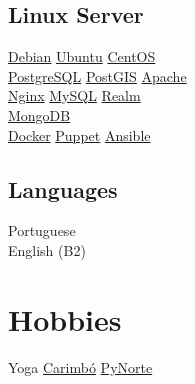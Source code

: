 \documentclass[]{joaosoares-resume}
\begin{document}
\begin{minipage}[t]{0.35\textwidth}
\subsection{Linux Server}
\href{http://www.debian.org/}{Debian}\textbullet{}
\href{http://www.ubuntu.com/}{Ubuntu}\textbullet{}
\href{http://www.centos.org/}{CentOS} \\
\href{http://www.postgresql.org/}{PostgreSQL}\textbullet{}
\href{http://www.postgis.net}{PostGIS}\textbullet{}
\href{http://httpd.apache.org/}{Apache}\\
\href{https://www.nginx.com/resources/wiki/}{Nginx}\textbullet{}
\href{https://www.mysql.com/}{MySQL} \textbullet{}
\href{https://realm.io/}{Realm}\\
\href{https://www.mongodb.com/}{MongoDB} \\
\href{http://www.docker.com/}{Docker} \textbullet{}
\href{http://puppetlabs.com/}{Puppet} \textbullet{}
\href{https://www.ansible.com/}{Ansible} \\
\sectionsep

\subsection{Languages}
Portuguese \\
English (B2) \\
\sectionsep

\section{Hobbies}
Yoga \textbullet{} \href{https://en.wikipedia.org/wiki/Carimbo}{Carimbó} \textbullet{} \href{http://pynorte.python.org.br}{PyNorte}\\


\end{minipage}
\hfill
\end{document}
